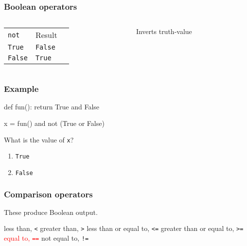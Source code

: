 \documentclass[11pt]{beamer}
\begin{document}
\begin{frame}[fragile]
  \frametitle{Boolean operators}
  \Enlarge

  \begin{columns}
  \begin{column}{0.6\textwidth}
  \begin{tabular}{lll}
  \texttt{not}   & Result         \\
  \texttt{True}  & \texttt{False} \\
  \texttt{False} & \texttt{True}  \\
  \end{tabular}
  \end{column}
  \begin{column}{0.4\textwidth}
    Inverts truth-value
  \end{column}
  \end{columns}
\end{frame}

\begin{frame}[fragile]
  \frametitle{Example}
  \Enlarge

  \begin{semiverbatim}
def fun():
    return True and False

x = fun() and not (True or False)
  \end{semiverbatim}
  What is the value of \texttt{x}?
  \begin{enumerate}[label=\Alph*]
  \item  \texttt{True}
  \item  \texttt{False}
  \end{enumerate}
\end{frame}

\begin{frame}[fragile]
  \frametitle{Comparison operators}
  \Enlarge

  \begin{itemize}
  \myitem  These produce Boolean output.
    \begin{itemize}
    \mysubitem  less than, \texttt{<}
    \mysubitem  greater than, \texttt{>}
    \mysubitem  less than or equal to, \texttt{<=}
    \mysubitem  greater than or equal to, \texttt{>=}
    \mysubitem  \textcolor{red}{equal to, \texttt{==}}
    \mysubitem  not equal to, \texttt{!=}
    \end{itemize}
  \end{itemize}
\end{frame}
\end{document}
